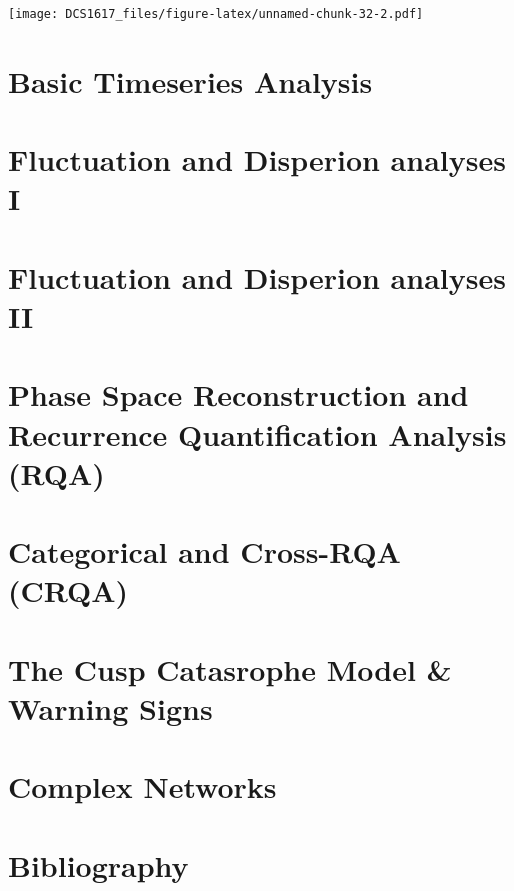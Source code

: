 \documentclass[]{book}
\begin{document}
\texttt{[image: DCS1617\_files/figure-latex/unnamed-chunk-32-2.pdf]}

\chapter{\texorpdfstring{\textbf{Basic Timeseries
Analysis}}{Basic Timeseries Analysis}}\label{btasol}

\chapter{\texorpdfstring{\textbf{Fluctuation and Disperion analyses
I}}{Fluctuation and Disperion analyses I}}\label{fda1sol}

\chapter{\texorpdfstring{\textbf{Fluctuation and Disperion analyses
II}}{Fluctuation and Disperion analyses II}}\label{fda1so2}

\chapter{\texorpdfstring{\textbf{Phase Space Reconstruction and
Recurrence Quantification Analysis
(RQA)}}{Phase Space Reconstruction and Recurrence Quantification Analysis (RQA)}}\label{RQAsol}

\chapter{\texorpdfstring{\textbf{Categorical and Cross-RQA
(CRQA)}}{Categorical and Cross-RQA (CRQA)}}\label{CRQAsol}

\chapter{\texorpdfstring{\textbf{The Cusp Catasrophe Model \& Warning
Signs}}{The Cusp Catasrophe Model \& Warning Signs}}\label{cuspsol}

\chapter{\texorpdfstring{\textbf{Complex
Networks}}{Complex Networks}}\label{netssol}

\chapter*{\texorpdfstring{\textbf{Bibliography}}{Bibliography}}\label{bibliography}


\end{document}
